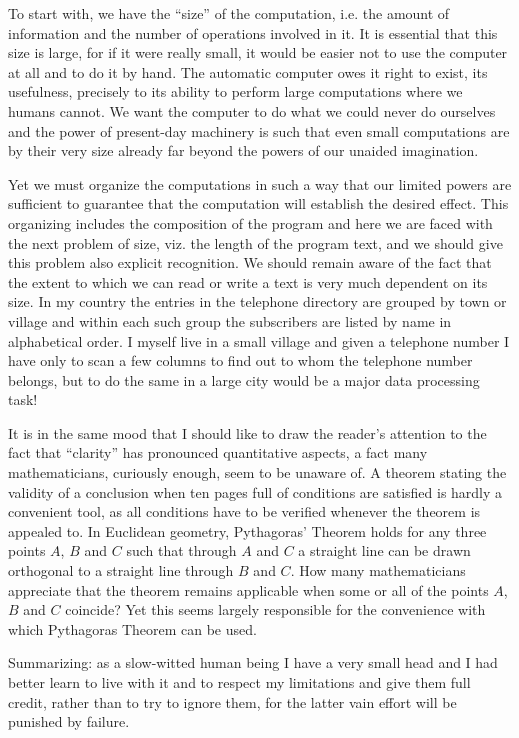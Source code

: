 To start with, we have the ``size'' of the computation, i.e. the amount of information and the number of operations involved in it. It is essential that this size is large, for if it were really small, it would be easier not to use the computer at all and to do it by hand. The automatic computer owes it right to exist, its usefulness, precisely to its ability to perform large computations where we humans cannot. We want the computer to do what we could never do ourselves and the power of present-day machinery is such that even small computations are by their very size already far beyond the powers of our unaided imagination.

Yet we must organize the computations in such a way that our limited powers are sufficient to guarantee that the computation will establish the desired effect. This organizing includes the composition of the program and here we are faced with the next problem of size, viz. the length of the program text, and we should give this problem also explicit recognition. We should remain aware of the fact that the extent to which we can read or write a text is very much dependent on its size. In my country the entries in the telephone directory are grouped by town or village and within each such group the subscribers are listed by name in alphabetical order. I myself live in a small village and given a telephone number I have only to scan a few columns to find out to whom the telephone number belongs, but to do the same in a large city would be a major data processing task!

It is in the same mood that I should like to draw the reader's attention to the fact that ``clarity'' has pronounced quantitative aspects, a fact many mathematicians, curiously enough, seem to be unaware of. A theorem stating the validity of a conclusion when ten pages full of conditions are satisfied is hardly a convenient tool, as all conditions have to be verified whenever the theorem is appealed to. In Euclidean geometry, Pythagoras' Theorem holds for any three points $A$, $B$ and $C$ such that through $A$ and $C$ a straight line can be drawn orthogonal to a straight line through $B$ and $C$. How many mathematicians appreciate that the theorem remains applicable when some or all of the points $A$, $B$ and $C$ coincide? Yet this seems largely responsible for the convenience with which Pythagoras Theorem can be used.

Summarizing: as a slow-witted human being I have a very small head and I had better learn to live with it and to respect my limitations and give them full credit, rather than to try to ignore them, for the latter vain effort will be punished by failure.

